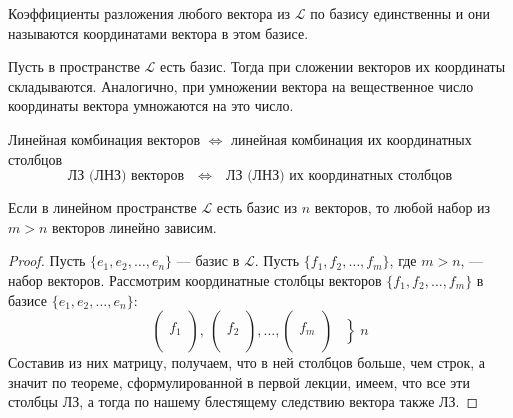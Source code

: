 \documentclass[11pt]{article}
\begin{document}
\begin{remark}
    Коэффициенты разложения любого вектора из $\mathcal{L}$ по базису единственны и они называются координатами
    вектора в этом базисе.
\end{remark}

\begin{statement}
    Пусть в пространстве $\mathcal{L}$ есть базис. Тогда при сложении векторов их координаты
    складываются. Аналогично, при умножении вектора на вещественное число 
    координаты вектора умножаются на это число.
\end{statement}

\begin{consequence}
    Линейная комбинация векторов $\Longleftrightarrow$ линейная комбинация 
    их координатных столбцов \[ \text{ЛЗ (ЛНЗ) векторов} \quad 
    \Longleftrightarrow \quad \text{ЛЗ (ЛНЗ) их координатных столбцов}\]
\end{consequence}

\begin{theorem}
    Если в линейном пространстве $\mathcal{L}$ есть базис из $n$ векторов, то 
    любой набор из  $m > n$ векторов линейно зависим.
\end{theorem}

\begin{proof}
    Пусть $\{ e_1, e_2, \dots, e_n\}$ --- базис в $\mathcal{L}$. Пусть 
    $\{ f_1, f_2, \dots, f_m\}$, где $m > n$, --- набор векторов.
    Рассмотрим координатные столбцы векторов $\{ f_1, f_2, \dots, f_m\}$
    в базисе $\{ e_1, e_2, \dots, e_n\}$:
    \[ \left(
        \begin{array}{c}
            \\ f_1 \\ \\
        \end{array}
    \right), \ \left(
        \begin{array}{c}
            \\ f_2 \\ \\
        \end{array}
    \right), \dots , \left(
        \begin{array}{c}
            \\ f_m \\ \\            
        \end{array}
    \right) \left. \begin{array}{l}
        \\ \\ \\
    \end{array}\right\} \  n
    \]
    Составив из них матрицу, получаем, что в ней столбцов больше, чем строк, а значит по теореме, сформулированной в первой лекции, имеем, что все эти столбцы ЛЗ, а тогда по нашему блестящему следствию
    вектора также ЛЗ.
\end{proof}
\end{document}
